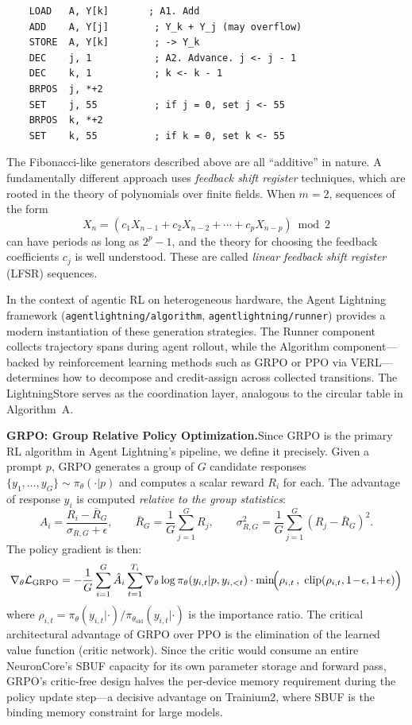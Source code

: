 \documentclass[12pt]{article}
\newcommand{\SBUF}{\textsc{SBUF}}                 %
\begin{document}
\begin{verbatim}
    LOAD   A, Y[k]       ; A1. Add
    ADD    A, Y[j]        ; Y_k + Y_j (may overflow)
    STORE  A, Y[k]        ; -> Y_k
    DEC    j, 1           ; A2. Advance. j <- j - 1
    DEC    k, 1           ; k <- k - 1
    BRPOS  j, *+2
    SET    j, 55          ; if j = 0, set j <- 55
    BRPOS  k, *+2
    SET    k, 55          ; if k = 0, set k <- 55
\end{verbatim}

\bigskip

The Fibonacci-like generators described above are all ``additive'' in nature. A fundamentally different approach uses \emph{feedback shift register} techniques, which are rooted in the theory of polynomials over finite fields. When $m = 2$, sequences of the form
\[
X_n = (c_1 X_{n-1} + c_2 X_{n-2} + \cdots + c_p X_{n-p}) \bmod 2
\]
can have periods as long as $2^p - 1$, and the theory for choosing the feedback coefficients $c_j$ is well understood. These are called \emph{linear feedback shift register} (LFSR) sequences.

In the context of agentic RL on heterogeneous hardware, the Agent Lightning framework \citep{agentlightning2025} (\texttt{agentlightning/algorithm}, \texttt{agentlightning/runner}) provides a modern instantiation of these generation strategies. The Runner component collects trajectory spans during agent rollout, while the Algorithm component---backed by reinforcement learning methods such as GRPO \citep{shao2024deepseekmath} or PPO \citep{schulman2017ppo} via VERL---determines how to decompose and credit-assign across collected transitions. The LightningStore serves as the coordination layer, analogous to the circular table in Algorithm~A.

\medskip
\noindent\textbf{GRPO: Group Relative Policy Optimization.}\quad Since GRPO is the primary RL algorithm in Agent Lightning's pipeline, we define it precisely. Given a prompt $p$, GRPO generates a group of $G$ candidate responses $\{y_1, \ldots, y_G\} \sim \pi_\theta(\cdot | p)$ and computes a scalar reward $R_i$ for each. The advantage of response $y_i$ is computed \emph{relative to the group statistics}:
\[
\hat{A}_i = \frac{R_i - \bar{R}_G}{\sigma_{R,G} + \epsilon}, \qquad \bar{R}_G = \frac{1}{G}\sum_{j=1}^G R_j, \qquad \sigma_{R,G}^2 = \frac{1}{G}\sum_{j=1}^G (R_j - \bar{R}_G)^2.
\]
The policy gradient is then:
\[
\nabla_\theta \mathcal{L}_{\mathrm{GRPO}} = -\frac{1}{G}\sum_{i=1}^G \hat{A}_i \sum_{t=1}^{T_i} \nabla_\theta \log \pi_\theta(y_{i,t} | p, y_{i,<t}) \cdot \min\!\Bigl(\rho_{i,t}\,,\; \mathrm{clip}(\rho_{i,t}, 1\!-\!\epsilon, 1\!+\!\epsilon)\Bigr)
\]
where $\rho_{i,t} = \pi_\theta(y_{i,t} | \cdot) / \pi_{\theta_{\mathrm{old}}}(y_{i,t} | \cdot)$ is the importance ratio. The critical architectural advantage of GRPO over PPO is the elimination of the learned value function (critic network). Since the critic would consume an entire NeuronCore's \SBUF{} capacity for its own parameter storage and forward pass, GRPO's critic-free design halves the per-device memory requirement during the policy update step---a decisive advantage on Trainium2, where \SBUF{} is the binding memory constraint for large models.
\end{document}

